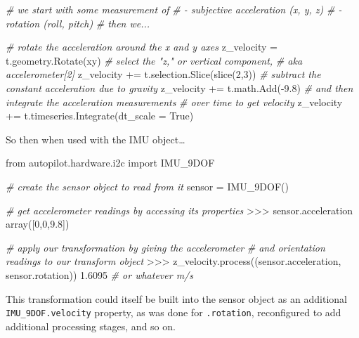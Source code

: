 \documentclass[10pt]{article}
\newenvironment{Shaded}{}{}
\newcommand{\BuiltInTok}[1]{#1}
\newcommand{\CommentTok}[1]{\textcolor[rgb]{0.38,0.63,0.69}{\textit{#1}}}
\newcommand{\DecValTok}[1]{\textcolor[rgb]{0.25,0.63,0.44}{#1}}
\newcommand{\FloatTok}[1]{\textcolor[rgb]{0.25,0.63,0.44}{#1}}
\newcommand{\ImportTok}[1]{#1}
\newcommand{\NormalTok}[1]{#1}
\newcommand{\OperatorTok}[1]{\textcolor[rgb]{0.40,0.40,0.40}{#1}}
\newcommand{\StringTok}[1]{\textcolor[rgb]{0.25,0.44,0.63}{#1}}
\newcommand{\VariableTok}[1]{\textcolor[rgb]{0.10,0.09,0.49}{#1}}
\begin{document}
\begin{multicols}{2}
\begin{Shaded}
\begin{Highlighting}[]
\CommentTok{\# we start with some measurement of}
\CommentTok{\# {-} subjective acceleration (x, y, z)}
\CommentTok{\# {-} rotation (roll, pitch)}
\CommentTok{\# then we...}

\CommentTok{\# rotate the acceleration around the x and y axes}
\NormalTok{z\_velocity }\OperatorTok{=}\NormalTok{ t.geometry.Rotate(}\StringTok{\textquotesingle{}xy\textquotesingle{}}\NormalTok{) }
\CommentTok{\# select the "z," or vertical component, }
\CommentTok{\# aka accelerometer[2]}
\NormalTok{z\_velocity }\OperatorTok{+=}\NormalTok{ t.selection.Slice(}\BuiltInTok{slice}\NormalTok{(}\DecValTok{2}\NormalTok{,}\DecValTok{3}\NormalTok{))}
\CommentTok{\# subtract the constant acceleration due to gravity}
\NormalTok{z\_velocity }\OperatorTok{+=}\NormalTok{ t.math.Add(}\OperatorTok{{-}}\FloatTok{9.8}\NormalTok{)}
\CommentTok{\# and then integrate the acceleration measurements}
\CommentTok{\# over time to get velocity}
\NormalTok{z\_velocity }\OperatorTok{+=}\NormalTok{ t.timeseries.Integrate(dt\_scale }\OperatorTok{=} \VariableTok{True}\NormalTok{)}
\end{Highlighting}
\end{Shaded}

So then when used with the IMU object\ldots{}

\begin{Shaded}
\begin{Highlighting}[]
\ImportTok{from}\NormalTok{ autopilot.hardware.i2c }\ImportTok{import}\NormalTok{ IMU\_9DOF}

\CommentTok{\# create the sensor object to read from it}
\NormalTok{sensor }\OperatorTok{=}\NormalTok{ IMU\_9DOF()}

\CommentTok{\# get accelerometer readings by accessing its properties}
\OperatorTok{\textgreater{}\textgreater{}\textgreater{}}\NormalTok{ sensor.acceleration}
\NormalTok{array([}\DecValTok{0}\NormalTok{,}\DecValTok{0}\NormalTok{,}\FloatTok{9.8}\NormalTok{])}

\CommentTok{\# apply our transformation by giving the accelerometer }
\CommentTok{\# and orientation readings to our transform object}
\OperatorTok{\textgreater{}\textgreater{}\textgreater{}}\NormalTok{ z\_velocity.process((sensor.acceleration, sensor.rotation))}
\FloatTok{1.6095} \CommentTok{\# or whatever m/s}
\end{Highlighting}
\end{Shaded}

This transformation could itself be built into the sensor object as an
additional \texttt{IMU\_9DOF.velocity} property, as was done for
\texttt{.rotation}, reconfigured to add additional processing stages,
and so on.


\end{multicols}
\end{document}
